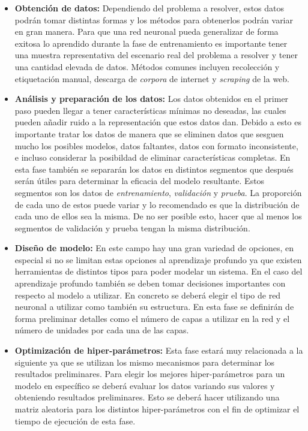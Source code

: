 \begin{itemize}
\item \textbf{Obtención de datos:} Dependiendo del problema a resolver, estos datos podrán tomar distintas formas y los métodos para obtenerlos podrán variar en gran manera. Para que una red neuronal pueda generalizar de forma exitosa lo aprendido durante la fase de entrenamiento es importante tener una muestra representativa del escenario real del problema a resolver y tener una cantidad elevada de datos. Métodos comunes incluyen recolección y etiquetación manual, descarga de \textit{corpora} de internet y \textit{scraping} de la web.

\item \textbf{Análisis y preparación de los datos:} Los datos obtenidos en el primer paso pueden llegar a tener características mínimas no deseadas, las cuales pueden añadir ruido a la representación que estos datos dan. Debido a esto es importante tratar los datos de manera que se eliminen datos que sesguen mucho los posibles modelos, datos faltantes, datos con formato inconsistente, e incluso considerar la posibildad de eliminar características completas. En esta fase también se separarán los datos en distintos segmentos que después serán útiles para determinar la eficacia del modelo resultante. Estos segmentos son los datos de \textit{entrenamiento}, \textit{validación} y \textit{prueba}. La proporción de cada uno de estos puede variar y lo recomendado es que la distribución de cada uno de ellos sea la misma. De no ser posible esto, hacer que al menos los segmentos de validación y prueba tengan la misma distribución.

\item \textbf{Diseño de modelo:} En este campo hay una gran variedad de opciones, en especial si no se limitan estas opciones al aprendizaje profundo ya que existen herramientas de distintos tipos para poder modelar un sistema. En el caso del aprendizaje profundo también se deben tomar decisiones importantes con respecto al modelo a utilizar. En concreto se deberá elegir el tipo de red neuronal a utilizar como también su estructura. En esta fase se definirán de forma preliminar detalles como el número de capas a utilizar en la red y el número de unidades por cada una de las capas.

\item \textbf{Optimización de hiper-parámetros:} Esta fase estará muy relacionada a la siguiente ya que se utilizan los mismo mecanismos para determinar los resultados preliminares. Para elegir los mejores hiper-parámetros para un modelo en específico se deberá evaluar los datos variando sus valores y obteniendo resultados preliminares. Esto se deberá hacer utilizando una matriz aleatoria para los distintos hiper-parámetros con el fin de optimizar el tiempo de ejecución de esta fase.


\end{itemize}
